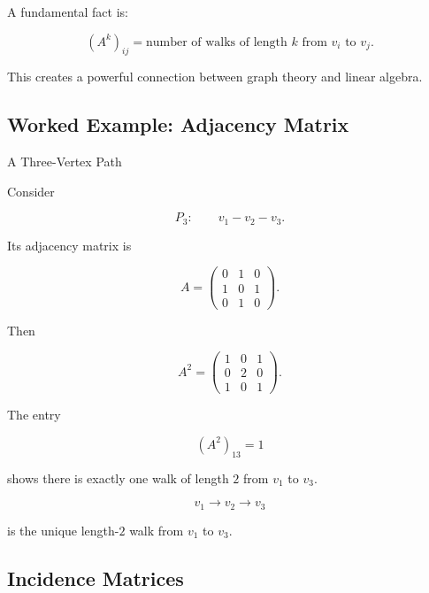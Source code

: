 A fundamental fact is:

\[
\boxed{
(A^k)_{ij}
=
\text{number of walks of length }k
\text{ from }v_i\text{ to }v_j.
}
\]

This creates a powerful connection between graph theory and linear
algebra.

\subsection{Worked Example: Adjacency Matrix}
\label{subsec:worked-adjacency-matrix}

\begin{workedexamplebox}{A Three-Vertex Path}

Consider

\[
P_3:
\qquad
v_1-v_2-v_3.
\]

Its adjacency matrix is

\[
A=
\begin{pmatrix}
0&1&0\\
1&0&1\\
0&1&0
\end{pmatrix}.
\]

Then

\[
A^2=
\begin{pmatrix}
1&0&1\\
0&2&0\\
1&0&1
\end{pmatrix}.
\]

The entry

\[
(A^2)_{13}=1
\]

shows there is exactly one walk of length \(2\) from \(v_1\) to \(v_3\).

\begin{answerbox}
\[
\boxed{
v_1\to v_2\to v_3
}
\]

is the unique length-\(2\) walk from \(v_1\) to \(v_3\).
\end{answerbox}

\end{workedexamplebox}

\subsection{Incidence Matrices}
\label{subsec:graph-incidence-matrices}

